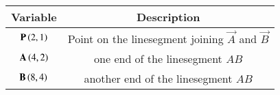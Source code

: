 \begin{tabular}[12pt]{ |c| c|}
    \hline
    \textbf{Variable} & \textbf{Description}\\ 
    \hline
	$\mathbf{P}\left(2,1\right)$ & Point on the linesegment joining $\vec{A}$ and $\vec{B}$ \\
    \hline 
	$\mathbf{A}\left(4,2\right)$ & one end of the linesegment $AB$ \\
    \hline
	$\mathbf{B}\left(8,4\right)$ & another end of the linesegment $AB$\\
    \hline 
    \end{tabular}
